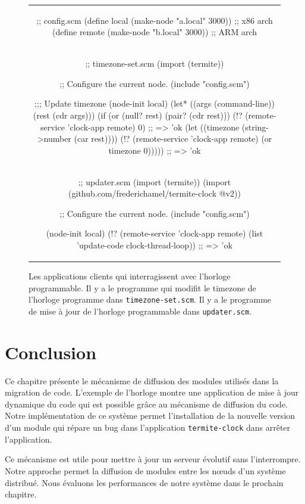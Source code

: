 \begin{figure}[ht]
  \centering\fontsize{10}{10}
  \begin{tabular}{c}
\begin{mplisting}{0.85}
;; config.scm
(define local    (make-node "a.local" 3000)) ;; x86 arch
(define remote   (make-node "b.local" 3000)) ;; ARM arch
\end{mplisting}\\[5ex]
\begin{mplisting}{0.85}
;; timezone-set.scm
(import (termite))

;; Configure the current node.
(include "config.scm")

;;; Update timezone
(node-init local)
(let* ((args (command-line))
       (rest (cdr args)))
  (if (or (null? rest)
          (pair? (cdr rest)))
      (!? (remote-service 'clock-app remote) 0) ;; => 'ok
      (let ((timezone (string->number (car rest))))
        (!? (remote-service 'clock-app remote) (or timezone 0))))) ;; => 'ok
\end{mplisting}\\[5ex]
\begin{mplisting}{0.85}
;; updater.scm
(import (termite))
(import (github.com/frederichamel/termite-clock @v2))

;; Configure the current node.
(include "config.scm")

(node-init local)
(!? (remote-service 'clock-app remote)
    (list 'update-code clock-thread-loop)) ;; => 'ok
\end{mplisting}
  \end{tabular}
  \caption{Les applications clients qui interragissent avec
    l'horloge programmable. Il y a le programme qui modifit
    le timezone de l'horloge programme dans \texttt{timezone-set.scm}.
    Il y a le programme de mise à jour de l'horloge programmable
    dans \texttt{updater.scm}.}
  \vspace*{4ex}
  \label{fig:termite_clock_client}
\end{figure}

\section{Conclusion}
Ce chapitre présente le mécanisme de diffusion des modules utilisés
dans la migration de code. L'exemple de l'horloge montre une application
de mise à jour dynamique du code qui est possible grâce au mécanisme
de diffusion du code. Notre implémentation de ce système permet l'installation
de la nouvelle version d'un module qui répare un bug dans l'application
\texttt{termite-clock} dans arrêter l'application.

Ce mécanisme est utile pour mettre à jour un serveur évolutif sans
l'interrompre. Notre approche permet la diffusion de modules entre les nœuds
d'un système distribué. Nous évaluons les performances de notre
système dans le prochain chapitre.
